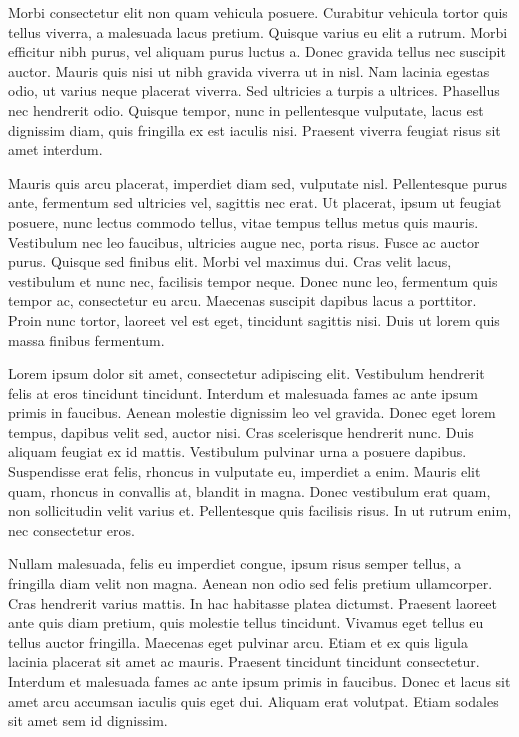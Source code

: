 Morbi consectetur elit non quam vehicula posuere. Curabitur vehicula tortor quis tellus viverra, a malesuada lacus pretium. Quisque varius eu elit a rutrum. Morbi efficitur nibh purus, vel aliquam purus luctus a. Donec gravida tellus nec suscipit auctor. Mauris quis nisi ut nibh gravida viverra ut in nisl. Nam lacinia egestas odio, ut varius neque placerat viverra. Sed ultricies a turpis a ultrices. Phasellus nec hendrerit odio. Quisque tempor, nunc in pellentesque vulputate, lacus est dignissim diam, quis fringilla ex est iaculis nisi. Praesent viverra feugiat risus sit amet interdum.

Mauris quis arcu placerat, imperdiet diam sed, vulputate nisl. Pellentesque purus ante, fermentum sed ultricies vel, sagittis nec erat. Ut placerat, ipsum ut feugiat posuere, nunc lectus commodo tellus, vitae tempus tellus metus quis mauris. Vestibulum nec leo faucibus, ultricies augue nec, porta risus. Fusce ac auctor purus. Quisque sed finibus elit. Morbi vel maximus dui. Cras velit lacus, vestibulum et nunc nec, facilisis tempor neque. Donec nunc leo, fermentum quis tempor ac, consectetur eu arcu. Maecenas suscipit dapibus lacus a porttitor. Proin nunc tortor, laoreet vel est eget, tincidunt sagittis nisi. Duis ut lorem quis massa finibus fermentum.

Lorem ipsum dolor sit amet, consectetur adipiscing elit. Vestibulum hendrerit felis at eros tincidunt tincidunt. Interdum et malesuada fames ac ante ipsum primis in faucibus. Aenean molestie dignissim leo vel gravida. Donec eget lorem tempus, dapibus velit sed, auctor nisi. Cras scelerisque hendrerit nunc. Duis aliquam feugiat ex id mattis. Vestibulum pulvinar urna a posuere dapibus. Suspendisse erat felis, rhoncus in vulputate eu, imperdiet a enim. Mauris elit quam, rhoncus in convallis at, blandit in magna. Donec vestibulum erat quam, non sollicitudin velit varius et. Pellentesque quis facilisis risus. In ut rutrum enim, nec consectetur eros.

Nullam malesuada, felis eu imperdiet congue, ipsum risus semper tellus, a fringilla diam velit non magna. Aenean non odio sed felis pretium ullamcorper. Cras hendrerit varius mattis. In hac habitasse platea dictumst. Praesent laoreet ante quis diam pretium, quis molestie tellus tincidunt. Vivamus eget tellus eu tellus auctor fringilla. Maecenas eget pulvinar arcu. Etiam et ex quis ligula lacinia placerat sit amet ac mauris. Praesent tincidunt tincidunt consectetur. Interdum et malesuada fames ac ante ipsum primis in faucibus. Donec et lacus sit amet arcu accumsan iaculis quis eget dui. Aliquam erat volutpat. Etiam sodales sit amet sem id dignissim.


